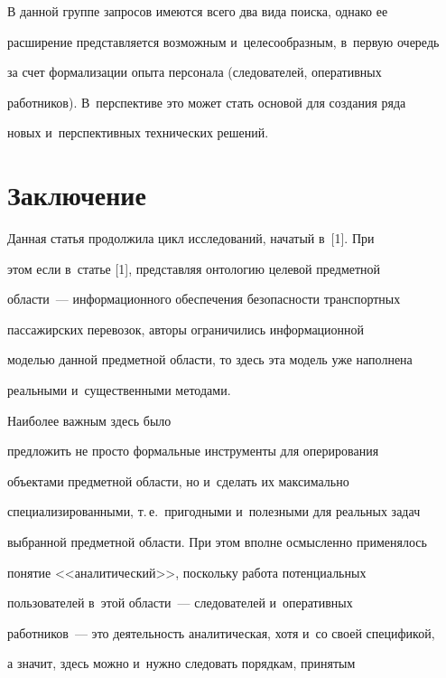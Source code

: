       


 В данной группе запросов имеются всего два вида поиска, однако ее 


расширение представляется возможным и~целесообразным, в~первую очередь 


за счет формализации опыта персонала (следователей, оперативных 


работников). В~перспективе это может стать основой для создания ряда 


новых и~перспективных технических решений.





\section{Заключение}


      


 Данная статья продолжила цикл исследований, начатый в~[1]. При 


этом если в~статье [1], представляя онтологию целевой предметной 


 области~--- информационного обеспечения безопасности транспортных 


пассажирских перевозок, авторы ограничились информационной 


моделью данной предметной области, то здесь эта модель уже наполнена 


реальными и~существенными методами. 







Наиболее важным здесь было 


предложить не просто формальные инструменты для оперирования 


объектами предметной области, но и~сделать их максимально 


специализированными, т.\,е.\ пригодными и~полезными для реальных задач 


выбранной предметной области. При этом вполне осмысленно применялось 


понятие <<аналитический>>, поскольку работа потенциальных 


пользователей в~этой области~--- следователей и~оперативных  


работников~--- это деятельность аналитическая, хотя и~со своей спецификой, 


а значит, здесь можно и~нужно следовать порядкам, принятым 



